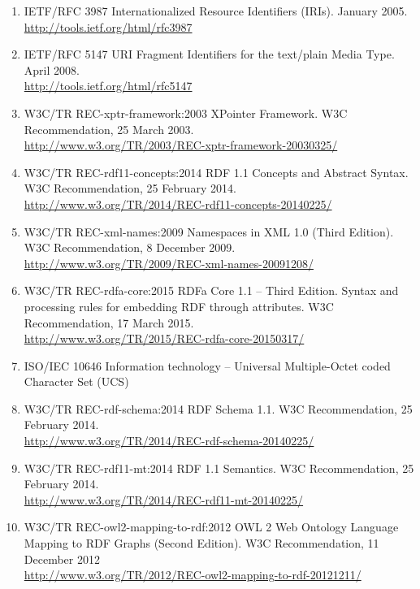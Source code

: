 \documentclass[10pt,fleqn,final]{scrreprt}
\begin{document}
\begin{enumerate}[label=\bfseries NR\arabic*:]
  \item{IETF/RFC 3987} {Internationalized Resource Identifiers (IRIs). January 2005.\\ \url{http://tools.ietf.org/html/rfc3987}}
  \item{IETF/RFC 5147} {URI Fragment Identifiers for the text/plain Media Type.  April 2008.\\ \url{http://tools.ietf.org/html/rfc5147}}
  \item{W3C/TR REC-xptr-framework:2003} {XPointer Framework.  W3C Recommendation, 25 March 2003. \\ \url{http://www.w3.org/TR/2003/REC-xptr-framework-20030325/}}
  \item{W3C/TR REC-rdf11-concepts:2014} {RDF 1.1 Concepts and Abstract Syntax.  W3C Recommendation, 25 February 2014. \\ \url{http://www.w3.org/TR/2014/REC-rdf11-concepts-20140225/}}
  \item{W3C/TR REC-xml-names:2009} {Namespaces in XML 1.0 (Third Edition). W3C Recommendation, 8 December 2009.\\
   \url{http://www.w3.org/TR/2009/REC-xml-names-20091208/}}
  \item{W3C/TR REC-rdfa-core:2015} {RDFa Core 1.1 -- Third Edition.  Syntax and processing rules for embedding RDF through attributes. W3C Recommendation, 17 March 2015.\\ \url{http://www.w3.org/TR/2015/REC-rdfa-core-20150317/}}
  \item{ISO/IEC 10646} {Information technology – Universal Multiple-Octet coded Character Set (UCS)}
  \item{W3C/TR REC-rdf-schema:2014} {RDF Schema 1.1. W3C Recommendation, 25 February 2014.\\ \url{http://www.w3.org/TR/2014/REC-rdf-schema-20140225/}}
  \item{W3C/TR REC-rdf11-mt:2014} {RDF 1.1 Semantics.  W3C Recommendation, 25 February 2014. \\ \url{http://www.w3.org/TR/2014/REC-rdf11-mt-20140225/}}
  \item{W3C/TR REC-owl2-mapping-to-rdf:2012} {OWL 2 Web Ontology Language
Mapping to RDF Graphs (Second Edition).  W3C Recommendation, 11 December 2012\\ \url{http://www.w3.org/TR/2012/REC-owl2-mapping-to-rdf-20121211/}}

\end{enumerate}
\end{document}
